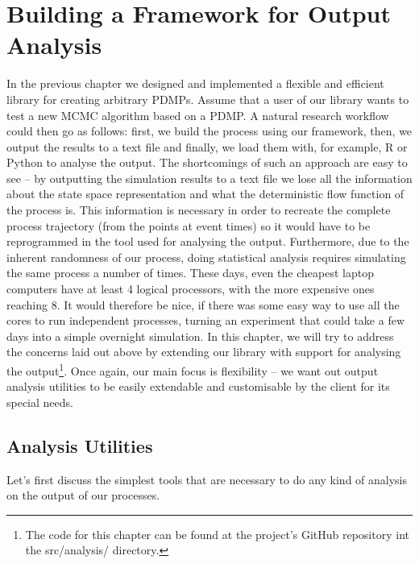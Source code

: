 \documentclass[report.tex]{subfiles}
\begin{document}
\chapter{Building a Framework for Output Analysis}
\label{output-analysis-framework}

In the previous chapter we designed and implemented a flexible and efficient
library for creating arbitrary PDMPs.
Assume that a user of our library wants to test a new MCMC algorithm based on
a PDMP.
A natural research workflow could then go as follows: first, we build the process
using our framework, then, we output the results to a text file and finally, we load
them with, for example, R or Python to analyse the output.
The shortcomings of such an approach are easy to see --
by outputting the simulation results to a text file we lose all the information
about the state space representation and what the deterministic flow function of the
process is.
This information is necessary in order to recreate the complete process trajectory (from the points at event times)
so it would have to be reprogrammed in the tool used for analysing the output.
Furthermore, due to the inherent randomness of our process, doing statistical
analysis requires simulating the same process a number of times.
These days, even the cheapest laptop computers have at least 4 logical processors, with the more
expensive ones reaching 8.
It would therefore be nice, if there was some easy way to use all the cores to run
independent processes, turning an experiment that could take a few days into a
simple overnight simulation.
In this chapter, we will try to address the concerns laid out above by extending
our library with support for analysing the
output\footnote{The code for this chapter can be found at the project's GitHub
repository int the src/analysis/ directory.}.
Once again, our main focus is flexibility -- we want out output analysis utilities
to be easily extendable and customisable by the client for its special needs.

\section{Analysis Utilities}
Let's first discuss the simplest tools that are necessary to do any kind of analysis
on the output of our processes.
\end{document}
